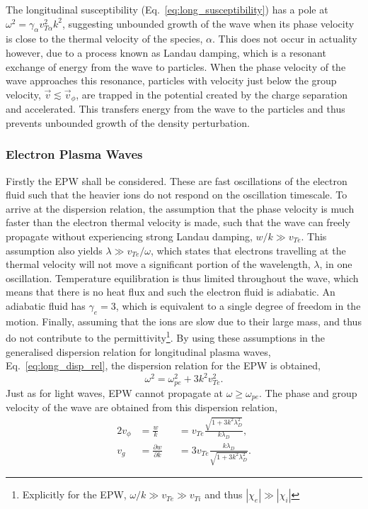 The longitudinal susceptibility (Eq.~\ref{eq:long_susceptibility}) has a pole at $\omega^2 = \gamma_\alpha v_{T\alpha}^2 k^2$, suggesting unbounded growth of the wave when its phase velocity is close to the thermal velocity of the species, $\alpha$.
This does not occur in actuality however, due to a process known as Landau damping, which is a resonant exchange of energy from the wave to particles.
When the phase velocity of the wave approaches this resonance, particles with velocity just below the group velocity, $\vec{v}\lesssim\vec{v}_\phi$, are trapped in the potential created by the charge separation and accelerated.
This transfers energy from the wave to the particles and thus prevents unbounded growth of the density perturbation.

\subsubsection{Electron Plasma Waves}%
\label{sec:theory_EPWs}

Firstly the \ac{EPW} shall be considered.
These are fast oscillations of the electron fluid such that the heavier ions do not respond on the oscillation timescale.
To arrive at the dispersion relation, the assumption that the phase velocity is much faster than the electron thermal velocity is made, such that the wave can freely propagate without experiencing strong Landau damping, $w/k \gg v_{Te}$.
This assumption also yields $\lambda \gg v_{Te}/\omega$, which states that electrons travelling at the thermal velocity will not move a significant portion of the wavelength, $\lambda$, in one oscillation.
Temperature equilibration is thus limited throughout the wave, which means that there is no heat flux and such the electron fluid is adiabatic.
An adiabatic fluid has $\gamma_e=3$, which is equivalent to a single degree of freedom in the motion.
Finally, assuming that the ions are slow due to their large mass, and thus do not contribute to the permittivity\footnote{Explicitly for the \ac{EPW}, $\omega/k \gg v_{Te} \gg v_{Ti}$ and thus $|\chi_e| \gg |\chi_i|$}.
By using these assumptions in the generalised dispersion relation for longitudinal plasma waves, Eq.~\ref{eq:long_disp_rel}, the dispersion relation for the \ac{EPW} is obtained,
\begin{equation}
    \omega^2 = \omega_{pe}^2 + 3k^2v_{Te}^2.
\end{equation}
Just as for light waves, \ac{EPW} cannot propagate at $\omega\geq\omega_{pe}$.
The phase and group velocity of the wave are obtained from this dispersion relation,
\begin{alignat}{2}
    v_\phi &= \frac{w}{k} &&= v_{Te}\frac{\sqrt{1+3k^2\lambda_{D}^2}}{k\lambda_D},\\
    v_g &= \frac{\partial w}{\partial k} &&= 3v_{Te}\frac{k\lambda_D}{\sqrt{1+3k^2\lambda_{D}^2}}.
\end{alignat}

